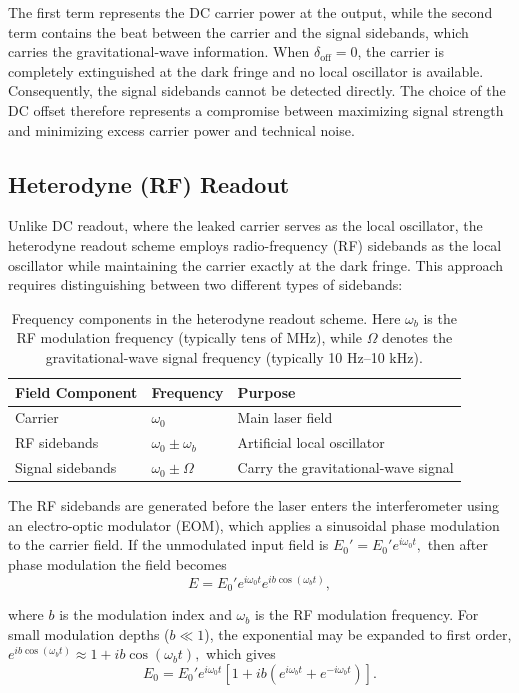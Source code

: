 \documentclass{report}
\begin{document}
The first term represents the DC carrier power at the output, while the second term contains the beat between the carrier and the signal sidebands, which carries the gravitational-wave information. When $\delta_{\mathrm{off}}=0$, the carrier is completely extinguished at the dark fringe and no local oscillator is available. Consequently, the signal sidebands cannot be detected directly. The choice of the DC offset therefore represents a compromise between maximizing signal strength and minimizing excess carrier power and technical noise.

\subsection{Heterodyne (RF) Readout}

Unlike DC readout, where the leaked carrier serves as the local oscillator, the heterodyne readout scheme employs radio-frequency (RF) sidebands as the local oscillator while maintaining the carrier exactly at the dark fringe. This approach requires distinguishing between two different types of sidebands:
\begin{table}[h]
\centering
\begin{tabular}{lll}
\hline
\textbf{Field Component} & \textbf{Frequency} & \textbf{Purpose} \\
\hline
Carrier & $\omega_0$ & Main laser field \\
RF sidebands & $\omega_0 \pm \omega_b$ & Artificial local oscillator \\
Signal sidebands & $\omega_0 \pm \Omega$ & Carry the gravitational-wave signal \\
\hline
\end{tabular}
\caption{Frequency components in the heterodyne readout scheme. Here $\omega_b$ is the RF modulation frequency (typically tens of MHz), while $\Omega$ denotes the gravitational-wave signal frequency (typically 10 Hz--10 kHz).}
\end{table}

The RF sidebands are generated before the laser enters the interferometer using an electro-optic modulator (EOM), which applies a sinusoidal phase modulation to the carrier field. If the unmodulated input field is
$E_0' = E_0' e^{i\omega_0 t},$ then after phase modulation the field becomes
\begin{equation}
    E = E_0' e^{i\omega_0 t} e^{ib\cos(\omega_b t)},
\end{equation}

where $b$ is the modulation index and $\omega_b$ is the RF modulation frequency. For small modulation depths ($b \ll 1$), the exponential may be expanded to first order, $e^{ib\cos(\omega_b t)}
\approx
1+ib\cos(\omega_b t),$
which gives
\begin{equation}
    E_0
=
E_0'
e^{i\omega_0 t}
\left[
1
+
ib
\left(
e^{i\omega_b t}
+
e^{-i\omega_b t}
\right)
\right].
\end{equation}
\end{document}
